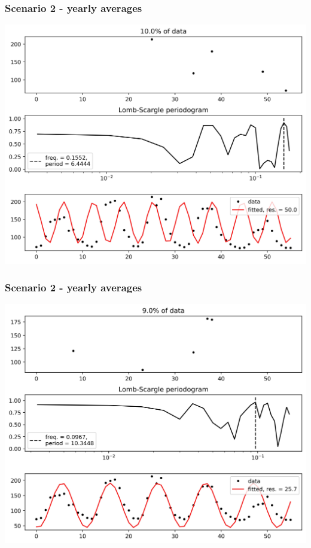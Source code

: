 \documentclass{beamer}
\begin{document}
\begin{frame}
\frametitle{Scenario 2 - yearly averages}
\begin{center}
\includegraphics[scale=0.55]{../scripts/dataset3/periodograms_ny2.0_model1_pg0.9.jpg}
\end{center}
\end{frame}
\begin{frame}
\frametitle{Scenario 2 - yearly averages}
\begin{center}
\includegraphics[scale=0.55]{../scripts/dataset3/periodograms_ny2.0_model1_pg0.91.jpg}
\end{center}
\end{frame}
\end{document}
